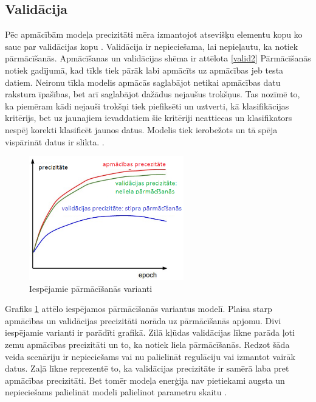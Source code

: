 \documentclass[12pt,paper=A4]{report}
\begin{document}
\subsection{Validācija}
\label{appendix:Validation}
Pēc apmācībām modeļa precizitāti mēra izmantojot atsevišķu elementu kopu 
ko sauc par validācijas kopu \cite{dtw19}. Validācija ir nepieciešama, lai nepieļautu, ka notiek 
pārmācīšanās. Apmācīšanas un validācijas shēma ir attēlota \ref{valid2} Pārmācīšanās notiek gadījumā, kad tīkls tiek pārāk 
labi apmācīts uz apmācības jeb testa datiem. Neironu tīkla modelis apmācās saglabājot netikai apmācības datu rakstura īpašības, bet arī saglabājot dažādus nejaušus trokšņus. 
Tas nozīmē to, ka piemēram kādi nejauši trokšņi tiek 
piefiksēti un uztverti, kā klasifikācijas 
kritērijs, bet uz jaunajiem ievaddatiem šie kritēriji neattiecas un klasifikators nespēj korekti klasificēt jaunos datus. Modelis tiek ierobežots un tā spēja vispārināt datus ir slikta. \cite{dtw20} . 
 
\begin{figure}[H] \centering
\includegraphics[width=0.60\textwidth]{overfiting} 
\caption{Iespējamie pārmācīšanās varianti \cite{dtw20}}  \label{valid} 
\end{figure}

Grafiks \ref{valid} attēlo iespējamos pārmācīšanās 
variantus modelī. Plaisa starp apmācības 
un validācijas precizitāti norāda uz 
pārmācīšanās apjomu.
Divi iespējamie varianti ir parādīti grafikā. 
Zilā kļūdas validācijas līkne parāda ļoti zemu
apmācības precizitāti un to, ka notiek liela pārmācīšanās.
Redzot šāda veida scenāriju ir nepieciešams vai nu 
palielināt regulāciju vai izmantot vairāk datus.
Zaļā līkne reprezentē to, ka validācijas precizitāte ir samērā 
laba pret apmācības precizitāti. Bet tomēr modeļa enerģija nav pietiekami 
augsta un nepieciešams palielināt modeli palielinot 
parametru skaitu \cite{dtw20}. 
\end{document}
